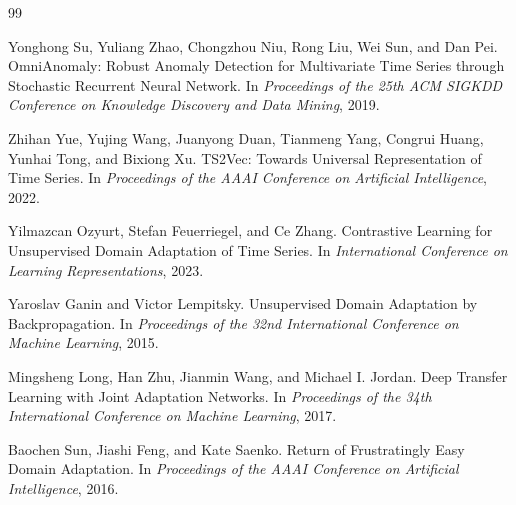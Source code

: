 \documentclass[a4paper]{article}
\begin{document}
\begin{thebibliography}{99}

Yonghong Su, Yuliang Zhao, Chongzhou Niu, Rong Liu, Wei Sun, and Dan Pei.
\newblock OmniAnomaly: Robust Anomaly Detection for Multivariate Time Series through Stochastic Recurrent Neural Network.
\newblock In \emph{Proceedings of the 25th ACM SIGKDD Conference on Knowledge Discovery and Data Mining}, 2019.

Zhihan Yue, Yujing Wang, Juanyong Duan, Tianmeng Yang, Congrui Huang, Yunhai Tong, and Bixiong Xu.
\newblock TS2Vec: Towards Universal Representation of Time Series.
\newblock In \emph{Proceedings of the AAAI Conference on Artificial Intelligence}, 2022.

Yilmazcan Ozyurt, Stefan Feuerriegel, and Ce Zhang.
\newblock Contrastive Learning for Unsupervised Domain Adaptation of Time Series.
\newblock In \emph{International Conference on Learning Representations}, 2023.

Yaroslav Ganin and Victor Lempitsky.
\newblock Unsupervised Domain Adaptation by Backpropagation.
\newblock In \emph{Proceedings of the 32nd International Conference on Machine Learning}, 2015.

Mingsheng Long, Han Zhu, Jianmin Wang, and Michael I. Jordan.
\newblock Deep Transfer Learning with Joint Adaptation Networks.
\newblock In \emph{Proceedings of the 34th International Conference on Machine Learning}, 2017.

Baochen Sun, Jiashi Feng, and Kate Saenko.
\newblock Return of Frustratingly Easy Domain Adaptation.
\newblock In \emph{Proceedings of the AAAI Conference on Artificial Intelligence}, 2016.

\end{thebibliography}
\end{document}
